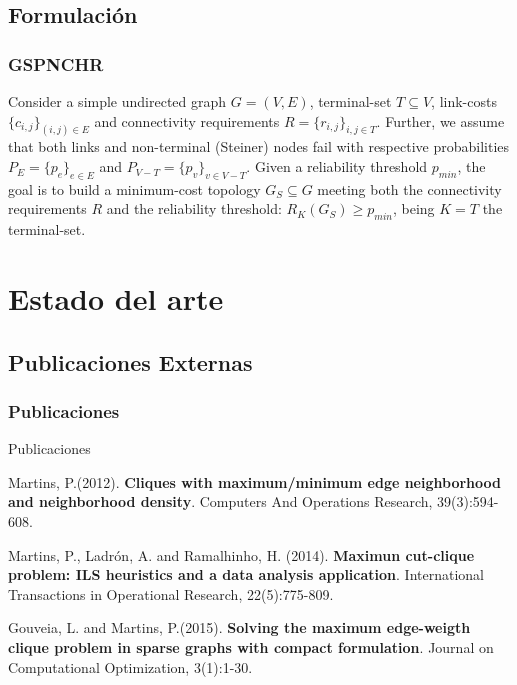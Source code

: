 \subsection{Formulación}
\begin{frame}\frametitle{GSPNCHR}
    \begin{definition}[GSPNCHR]
Consider a simple undirected graph $G=(V,E)$, terminal-set $T \subseteq V$, link-costs $\{c_{i,j}\}_{(i,j) \in E}$ 
and connectivity requirements $R=\{r_{i,j}\}_{i,j \in T}$. Further, we assume that both links and non-terminal (Steiner) nodes 
fail with respective probabilities $P_E=\{p_e\}_{e\in E}$ and $P_{V-T}=\{p_v\}_{v\in V-T}$. 
Given a reliability threshold $p_{min}$, the goal is to build 
a minimum-cost topology $G_S \subseteq G$ meeting both the connectivity requirements 
$R$ and the reliability threshold: $R_{K}(G_S) \geq p_{min}$, being $K=T$ the terminal-set.
\end{definition}
\end{frame}

\section{Estado del arte}
\subsection{Publicaciones Externas}
\begin{frame}\frametitle{Publicaciones}
\begin{block}{Publicaciones}
	\begin{enumerate}
	\end{enumerate}
\end{block}
\end{frame}

